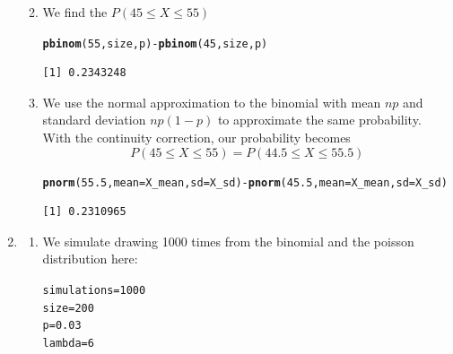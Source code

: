 \documentclass[12pt, a4paper]{article}\usepackage[]{graphicx}\usepackage[]{color}
\makeatletter
\newcommand{\hlnum}[1]{\textcolor[rgb]{0.686,0.059,0.569}{#1}}%
\newcommand{\hlopt}[1]{\textcolor[rgb]{0,0,0}{#1}}%
\newcommand{\hlstd}[1]{\textcolor[rgb]{0.345,0.345,0.345}{#1}}%
\newcommand{\hlkwb}[1]{\textcolor[rgb]{0.69,0.353,0.396}{#1}}%
\newcommand{\hlkwc}[1]{\textcolor[rgb]{0.333,0.667,0.333}{#1}}%
\newcommand{\hlkwd}[1]{\textcolor[rgb]{0.737,0.353,0.396}{\textbf{#1}}}%
\newenvironment{kframe}{%
 \def\at@end@of@kframe{}%
 \ifinner\ifhmode%
  \def\at@end@of@kframe{\end{minipage}}%
  \begin{minipage}{\columnwidth}%
 \fi\fi%
 \def\FrameCommand##1{\hskip\@totalleftmargin \hskip-\fboxsep
 \colorbox{shadecolor}{##1}\hskip-\fboxsep
     \hskip-\linewidth \hskip-\@totalleftmargin \hskip\columnwidth}%
 \MakeFramed {\advance\hsize-\width
   \@totalleftmargin\z@ \linewidth\hsize
   \@setminipage}}%
 {\par\unskip\endMakeFramed%
 \at@end@of@kframe}
\newenvironment{knitrout}{}{} %
\makeatother
\begin{document}
\begin{enumerate}
\begin{enumerate}[label=(\alph*)]
\begin{knitrout}
{}


\end{knitrout}
  
  \item 
  We find the $P(45 \le X \le 55)$ 
\begin{knitrout}\small
{}\color{fgcolor}\begin{kframe}
\begin{alltt}
\hlkwd{pbinom}\hlstd{(}\hlnum{55}\hlstd{, size, p)} \hlopt{-} \hlkwd{pbinom}\hlstd{(}\hlnum{45}\hlstd{, size, p)}
\end{alltt}
\begin{verbatim}
[1] 0.2343248
\end{verbatim}
\end{kframe}
\end{knitrout}
  \item  We use the normal approximation to the binomial with mean $np$ and standard deviation $np(1-p)$ to approximate the same probability. With the continuity correction, our probability becomes $$P(45 \le X \le 55) = P(44.5 \le X \le 55.5)$$
\begin{knitrout}\small
{}\color{fgcolor}\begin{kframe}
\begin{alltt}
\hlkwd{pnorm}\hlstd{(}\hlnum{55.5}\hlstd{,} \hlkwc{mean} \hlstd{= X_mean,} \hlkwc{sd} \hlstd{= X_sd)} \hlopt{-} \hlkwd{pnorm}\hlstd{(}\hlnum{45.5}\hlstd{,} \hlkwc{mean} \hlstd{= X_mean,} \hlkwc{sd} \hlstd{= X_sd)}
\end{alltt}
\begin{verbatim}
[1] 0.2310965
\end{verbatim}
\end{kframe}
\end{knitrout}
  \end{enumerate}
 \item  
  \begin{enumerate}
  \item
  We simulate drawing 1000 times from the binomial and the poisson distribution here:
\begin{knitrout}\small
{}\color{fgcolor}\begin{kframe}
\begin{alltt}
\hlstd{simulations} \hlkwb{=} \hlnum{1000}
\hlstd{size} \hlkwb{=} \hlnum{200}
\hlstd{p} \hlkwb{=} \hlnum{0.03}
\hlstd{lambda} \hlkwb{=} \hlnum{6}


\end{alltt}
\end{kframe}
\end{knitrout}
\end{enumerate}
\end{enumerate}
\end{document}
